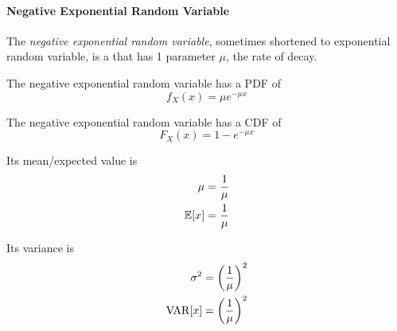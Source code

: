 \paragraph{Negative Exponential Random Variable}\label{par:Negative_Exponential_Random_Variable}
\begin{definition}\label{def:Negative_Exponential_Random_Variable}
  The \emph{negative exponential random variable}, sometimes shortened to exponential random variable, is a  that has 1 parameter $\mu$, the rate of decay.

  The negative exponential random variable has a PDF of
  \begin{equation}\label{eq:Negative_Exponential_Random_Variable-PDF}
    f_{X}(x) = \mu e^{-\mu x}
  \end{equation}

  The negative exponential random variable has a CDF of
  \begin{equation}\label{eq:Negative_Exponential_Random_Variable-CDF}
    F_{X}(x) = 1 - e^{-\mu x}
  \end{equation}

  Its mean/expected value is
  \begin{equation}\label{eq:Negative_Exponential_Random_Variable-Expected_Value}
    \begin{aligned}
      \mu &= \frac{1}{\mu} \\
      \operatorname{\operatorname{\mathbb{E}}}[x] &= \frac{1}{\mu} \\
    \end{aligned}
  \end{equation}

  Its variance is
  \begin{equation}\label{eq:Negative_Exponential_Random_Variable-Variance}
    \begin{aligned}
      \sigma^{2} &= {\left( \frac{1}{\mu} \right)}^{2} \\
      \operatorname{\operatorname{VAR}}[x] &= {\left( \frac{1}{\mu} \right)}^{2} \\
    \end{aligned}
  \end{equation}

\end{definition}
